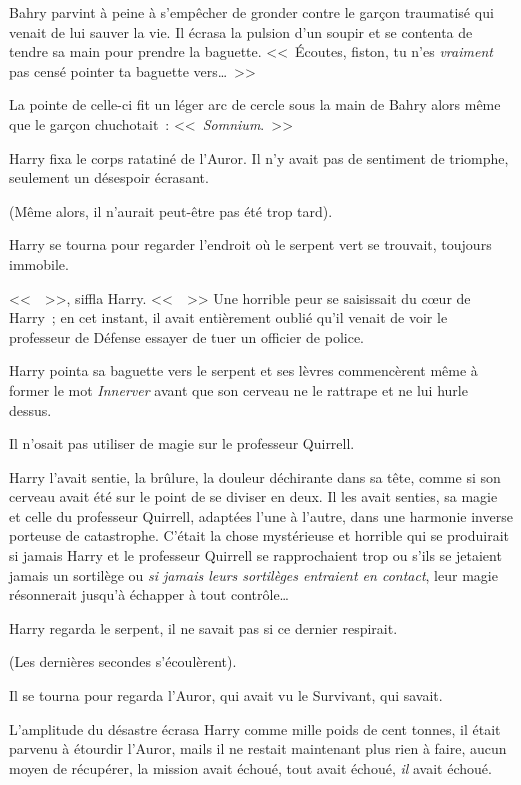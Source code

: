 Bahry parvint à peine à s'empêcher de gronder contre le garçon traumatisé qui venait de lui sauver la vie. Il écrasa la pulsion d'un soupir et se contenta de tendre sa main pour prendre la baguette. <<~Écoutes, fiston, tu n'es \emph{vraiment} pas censé pointer ta baguette vers…~>>

La pointe de celle-ci fit un léger arc de cercle sous la main de Bahry alors même que le garçon chuchotait~: <<~\emph{Somnium}.~>>

\later

Harry fixa le corps ratatiné de l'Auror. Il n'y avait pas de sentiment de triomphe, seulement un désespoir écrasant.

(Même alors, il n'aurait peut-être pas été trop tard).

Harry se tourna pour regarder l'endroit où le serpent vert se trouvait, toujours immobile.

<<~~>>, siffla Harry. <<~~>> Une horrible peur se saisissait du cœur de Harry~; en cet instant, il avait entièrement oublié qu'il venait de voir le professeur de Défense essayer de tuer un officier de police.

Harry pointa sa baguette vers le serpent et ses lèvres commencèrent même à former le mot \emph{Innerver} avant que son cerveau ne le rattrape et ne lui hurle dessus.

Il n'osait pas utiliser de magie sur le professeur Quirrell.

Harry l'avait sentie, la brûlure, la douleur déchirante dans sa tête, comme si son cerveau avait été sur le point de se diviser en deux. Il les avait senties, sa magie et celle du professeur Quirrell, adaptées l'une à l'autre, dans une harmonie inverse porteuse de catastrophe. C'était la chose mystérieuse et horrible qui se produirait si jamais Harry et le professeur Quirrell se rapprochaient trop ou s'ils se jetaient jamais un sortilège ou \emph{si jamais leurs sortilèges entraient en contact}, leur magie résonnerait jusqu'à échapper à tout contrôle…

Harry regarda le serpent, il ne savait pas si ce dernier respirait.

(Les dernières secondes s'écoulèrent).

Il se tourna pour regarda l'Auror, qui avait vu le Survivant, qui savait.

L'amplitude du désastre écrasa Harry comme mille poids de cent tonnes, il était parvenu à étourdir l'Auror, mails il ne restait maintenant plus rien à faire, aucun moyen de récupérer, la mission avait échoué, tout avait échoué, \emph{il} avait échoué.

